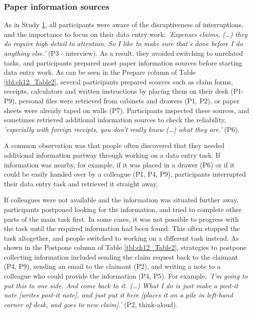 \subsubsection{Paper information sources}
As in Study \hyperref[st:Study1]{1}, all participants were aware of the disruptiveness of interruptions, and the importance to focus on their data entry work: \textit{'Expenses claims, (…) they do require high detail to attention. So I like to make sure that's done before I do anything else.'} (P3 - interview). As a result, they avoided switching to unrelated tasks, and participants prepared most paper information sources before starting data entry work. As can be seen in the Prepare column of Table \ref{tbl:ch12_Table2}, several participants prepared sources such as claim forms, receipts, calculators and written instructions by placing them on their desk (P1-P9), personal files were retrieved from cabinets and drawers (P1, P2), or paper sheets were already taped on walls (P7). Participants inspected these sources, and sometimes retrieved additional information sources to check the reliability, \textit{'especially with foreign receipts, you don't really know (…) what they are.'} (P6). 

A common observation was that people often discovered that they needed additional information partway through working on a data entry task. If information was nearby, for example, if it was placed in a drawer (P6) or if it could be easily handed over by a colleague (P1, P4, P9), participants interrupted their data entry task and retrieved it straight away. 

If colleagues were not available and the information was situated further away, participants postponed looking for the information, and tried to complete other parts of the main task first. In some cases, it was not possible to progress with the task until the required information had been found. This often stopped the task altogether, and people switched to working on a different task instead. As shown in the Postpone column of Table \ref{tbl:ch12_Table2}, strategies to postpone collecting information included sending the claim request back to the claimant (P4, P9), sending an email to the claimant (P2), and writing a note to a colleague who could provide the information (P4, P5). For example, \textit{'I'm going to put this to one side. And come back to it. (…) What I do is just make a post-it note [writes post-it note], and just put it here [places it on a pile in left-hand corner of desk, and goes to new claim].'} (P2, think-aloud). 

